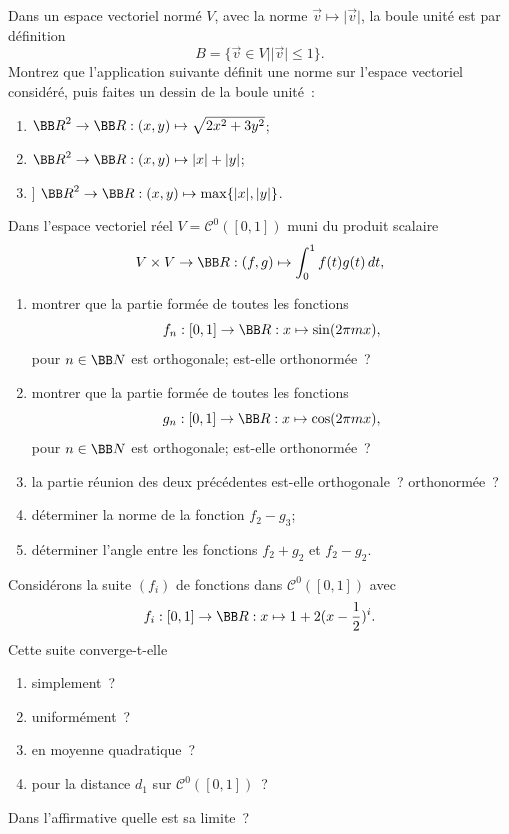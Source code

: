\documentclass[12pt,french,oneside,a4paper]{memoir} %
\begin{document}
\begin{exo}
Dans un espace vectoriel normé $V$, avec la norme $\vec{v}
\mapsto \vert \vec{v} \vert$, la boule unité est par définition
$$
B = \{\vec{v} \in V \mid \vert \vec{v} \vert \leq 1\}.
$$
Montrez que l'application suivante définit une norme sur l'espace vectoriel
considéré, puis faites un dessin de la boule unité~:
\begin{enumerate}
\item ${\BB R}^2 \rightarrow {\BB R} : (x,y) \mapsto \sqrt{2x^2+3y^2}$;
\item ${\BB R}^2 \rightarrow {\BB R} : (x,y) \mapsto \vert x \vert + \vert
y \vert$;
\item] ${\BB R}^2 \rightarrow {\BB R} : (x,y) \mapsto \max\{\vert x \vert,
\vert y \vert\}$.
\end{enumerate}
\end{exo}
\begin{exo}
Dans l'espace vectoriel réel $V=\mathcal{C}^0([0,1])$ muni du produit scalaire
$$
V \times V \rightarrow {\BB R} : (f,g) \mapsto \int_0^1 f(t) g(t) \, dt,
$$
\begin{enumerate}
\item montrer que la partie formée de toutes les fonctions
$$
f_n : [0,1] \rightarrow {\BB R} : x \mapsto \sin (2 \pi m x),
$$
pour $n \in {\BB N}$ est orthogonale; est-elle orthonormée~?
\item montrer que la partie formée de toutes les fonctions
$$
g_n : [0,1] \rightarrow {\BB R} : x \mapsto \cos (2 \pi m x),
$$
pour $n \in {\BB N}$ est orthogonale; est-elle orthonormée~?
\item la partie réunion des deux précédentes est-elle orthogonale~?
orthonormée~? 
\item déterminer la norme de la fonction $f_2-g_3$; 
\item déterminer l'angle entre les fonctions $f_2+g_2$ et $f_2-g_2$.
\end{enumerate}
\end{exo}
\begin{exo}
Considérons la suite $(f_i)$ de fonctions dans $\mathcal{C}^0([0,1])$ avec
$$
f_i : [0,1] \rightarrow {\BB R} : x \mapsto 1+2(x- \frac{1}{2})^i.
$$
Cette suite converge-t-elle
\begin{enumerate}
\item simplement~?
\item uniformément~? 
\item en moyenne quadratique~?
\item pour la distance $d_1$ sur $\mathcal{C}^0([0,1])$~? 
\end{enumerate}
Dans l'affirmative quelle est sa limite~?
\end{exo}
\end{document}
